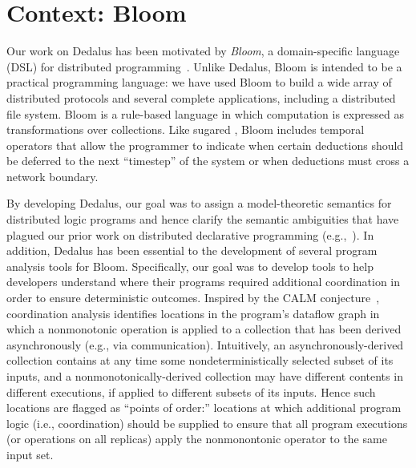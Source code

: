 \section{Context: Bloom}
Our work on Dedalus has been motivated by \emph{Bloom}, a domain-specific
language (DSL) for distributed programming~\cite{bloom}. Unlike Dedalus, Bloom
is intended to be a practical programming language: we have used Bloom to build
a wide array of distributed protocols and several complete applications,
including a distributed file system. Bloom is a rule-based language in which
computation is expressed as transformations over collections.  Like sugared
\lang, Bloom includes temporal operators that allow the programmer to indicate
when certain deductions should be deferred to the next ``timestep'' of the
system or when deductions must cross a network
boundary. %

By developing Dedalus, our goal was to assign a model-theoretic semantics for
distributed logic programs and hence clarify the semantic ambiguities that have
plagued our prior work on distributed declarative programming
(e.g.,~\cite{Mao2009,navarro-oper-sem}). In addition, Dedalus has been essential
to the development of several program analysis tools for Bloom. Specifically,
our goal was to develop tools to help developers understand where their programs
required additional coordination in order to ensure deterministic
outcomes. Inspired by the CALM conjecture~\cite{cidr11,declarative-imperative},
coordination analysis identifies locations in the program's dataflow graph in
which a nonmonotonic operation is applied to a collection that has been derived
asynchronously (e.g., via communication).  Intuitively, an
asynchronously-derived collection contains at any time some nondeterministically
selected subset of its inputs, and a nonmonotonically-derived collection may
have different contents in different executions, if applied to different subsets
of its inputs.  Hence such locations are flagged as ``points of order:''
locations at which additional program logic (i.e., coordination) should be
supplied to ensure that all program executions (or operations on all replicas)
apply the nonmonontonic operator to the same input set.

